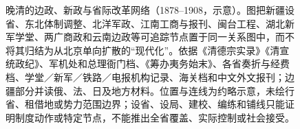 \begin{figure}[htbp]
  \caption{晚清的边政、新政与省际改革网络（1878--1908，示意）。图把新疆设省、东北体制调整、北洋军政、江南工商与报刊、闽台工程、湖北新军学堂、两广商政和云南边政等可追踪节点置于同一关系图中，而不将其归结为从北京单向扩散的“现代化”。依据《清德宗实录》《清宣统政纪》、军机处和总理衙门档、《筹办夷务始末》、各省奏折与经费档、学堂／新军／铁路／电报机构记录、海关档和中文外文报刊；边疆部分并读俄、法、日及地方材料。位置与连线为约略示意，未绘行省、租借地或势力范围边界；设省、设局、建校、编练和铺线只能证明制度动作或特定节点，不能推出全省覆盖、实际控制或社会接受。}
  \label{fig:provincial-reform-networks}
\end{figure}
